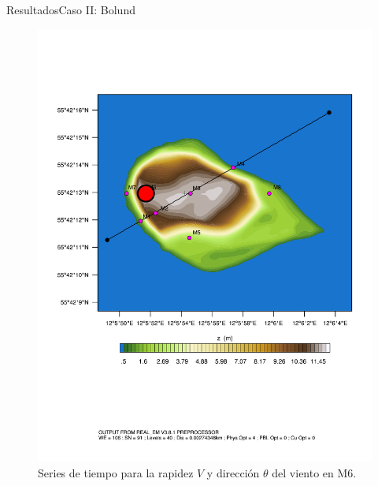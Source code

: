 \documentclass[mathserif,10pt]{beamer}
\begin{document}
\begin{frame}{Resultados}{Caso II: Bolund}
\begin{figure}[H]
\begin{minipage}{0.35\linewidth}
		\includegraphics[width=1\linewidth,page=1,trim={3.5cm 9.3cm 0.8cm 3.8cm},clip]{fig/05/ppt/bol_control_point6.pdf}%
	\end{minipage}%
		\vspace{-2mm}\caption{Series de tiempo para la rapidez $V$ y dirección $\theta$ del viento en M6.}
		\label{fig:06_bol_ts_m6}
	\end{figure}
\end{frame}
\end{document}
